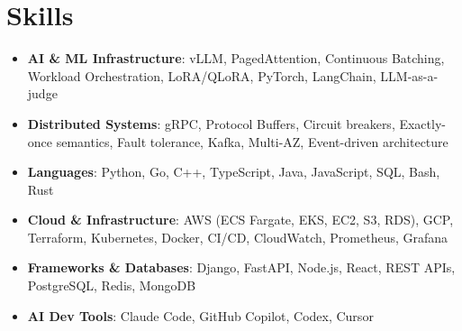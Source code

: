 \documentclass[letterpaper,11pt]{article}
\newcommand{\resumeSubHeadingListStart}{\begin{itemize}[leftmargin=0.15in, label={}]}
\newcommand{\resumeSubHeadingListEnd}{\end{itemize}}
\newcommand{\resumeSkillHeading}[2]{%
  \item\small{\textbf{#1}: #2 \vspace{-9pt}}%
}
\begin{document}
\section{Skills}
  \resumeSubHeadingListStart
    \resumeSkillHeading{AI \& ML Infrastructure}{vLLM, PagedAttention, Continuous Batching, Workload Orchestration, LoRA/QLoRA, PyTorch, LangChain, LLM-as-a-judge}
    \resumeSkillHeading{Distributed Systems}{gRPC, Protocol Buffers, Circuit breakers, Exactly-once semantics, Fault tolerance, Kafka, Multi-AZ, Event-driven architecture}
    \resumeSkillHeading{Languages}{Python, Go, C++, TypeScript, Java, JavaScript, SQL, Bash, Rust}
    \resumeSkillHeading{Cloud \& Infrastructure}{AWS (ECS Fargate, EKS, EC2, S3, RDS), GCP, Terraform, Kubernetes, Docker, CI/CD, CloudWatch, Prometheus, Grafana}
    \resumeSkillHeading{Frameworks \& Databases}{Django, FastAPI, Node.js, React, REST APIs, PostgreSQL, Redis, MongoDB}
    \resumeSkillHeading{AI Dev Tools}{Claude Code, GitHub Copilot, Codex, Cursor}
  \resumeSubHeadingListEnd
\end{document}
